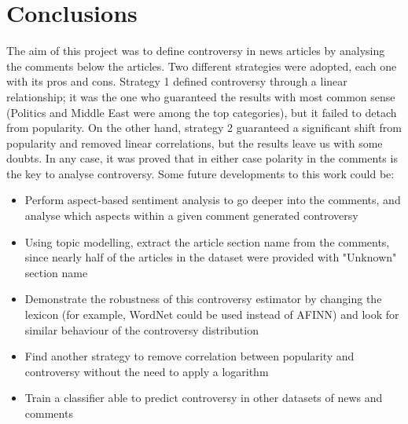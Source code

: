 \section{Conclusions}

The aim of this project was to define controversy in news articles by analysing the comments below the articles. Two different strategies were adopted, each one with its pros and cons.
Strategy 1 defined controversy through a linear relationship; it was the one who guaranteed the results with most common sense (Politics and Middle East were among the top categories), but it failed to detach from popularity.
On the other hand, strategy 2 guaranteed a significant shift from popularity and removed linear correlations, but the results leave us with some doubts.
In any case, it was proved that in either case polarity in the comments is the key to analyse controversy. 
Some future developments to this work could be:
\begin{itemize}
\item Perform aspect-based sentiment analysis to go deeper into the comments, and analyse which aspects within a given comment generated controversy
\item Using topic modelling, extract the article section name from the comments, since nearly half of the articles in the dataset were provided with "Unknown" section name
\item Demonstrate the robustness of this controversy estimator by changing the lexicon (for example, WordNet could be used instead of AFINN) and look for similar behaviour of the controversy distribution
\item Find another strategy to remove correlation between popularity and controversy without the need to apply a logarithm
\item Train a classifier able to predict controversy in other datasets of news and comments
\end{itemize}